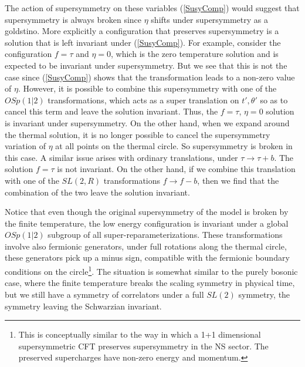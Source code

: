 \documentclass[aps,pre,preprint,onecolumn,citeautoscript,superscriptaddress,nofootinbib,eqsecnum]{revtex4-1}
\def\nref#1{(\ref{#1})}
\begin{document}
The action of supersymmetry on these variables \nref{SusyComp} would suggest that supersymmetry is always broken since $\eta$ shifts under 
supersymmetry as a goldstino. More explicitly a configuration that preserves supersymmetry is a solution that is left invariant under \nref{SusyComp}. 
For example, consider   the configuration $f =\tau$ and $\eta=0$, which is the zero temperature solution and is expected to be invariant under supersymmetry. 
But we see that this is not the case since \nref{SusyComp} shows that the transformation leads to a non-zero value of $\eta$. 
However, it is possible   to combine this supersymmetry
with one of the $OSp(1|2)$ transformations, which acts as a super translation on $t',\theta'$ so as to cancel this term and leave the solution invariant. Thus, the
$f=\tau$, $\eta=0$  solution is invariant under supersymmetry. 
On the other hand, when we expand around the thermal solution, it is no longer possible to cancel the
supersymmetry variation of $\eta$ at all points on the thermal circle. So supersymmetry is broken in this case. 
A similar issue arises with ordinary translations, under $\tau \to \tau + b$. The solution $f=\tau$ is not invariant. On the other hand, if we combine
this translation with one of the $SL(2,R)$ transformations $f \to f -b$, then we find that the combination of the two leave the solution invariant. 


Notice that even though the original supersymmetry of the model is broken by the finite temperature, the low energy configuration is
invariant under a global $OSp(1|2)$  subgroup of all super-reparameterizations. These transformations involve also fermionic generators, under full rotations along the 
thermal circle, these generators pick up a minus sign, compatible with the fermionic boundary conditions on the circle\footnote{
 This is conceptually similar to the way in 
which a 1+1 dimensional supersymmetric CFT preserves supersymmetry in the NS sector. The preserved supercharges have non-zero energy and momentum. }. 
The situation is somewhat similar to the purely bosonic case, where the finite temperature breaks the scaling symmetry in physical time, but we 
still have a symmetry of correlators under a full $SL(2)$ symmetry, the symmetry leaving the Schwarzian invariant. 
 
\end{document}
